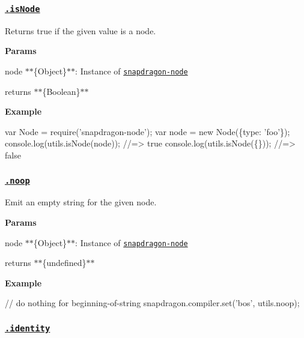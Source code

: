 \subsubsection*{\href{index.js#L21}{\tt .is\+Node}}

Returns true if the given value is a node.

{\bfseries Params}


\begin{DoxyItemize}
\item {\ttfamily node} $\ast$$\ast$\{Object\}$\ast$$\ast$\+: Instance of \href{https://github.com/jonschlinkert/snapdragon-node}{\tt snapdragon-\/node}
\item {\ttfamily returns} $\ast$$\ast$\{Boolean\}$\ast$$\ast$
\end{DoxyItemize}

{\bfseries Example}


\begin{DoxyCode}
var Node = require('snapdragon-node');
var node = new Node(\{type: 'foo'\});
console.log(utils.isNode(node)); //=> true
console.log(utils.isNode(\{\})); //=> false
\end{DoxyCode}


\subsubsection*{\href{index.js#L37}{\tt .noop}}

Emit an empty string for the given {\ttfamily node}.

{\bfseries Params}


\begin{DoxyItemize}
\item {\ttfamily node} $\ast$$\ast$\{Object\}$\ast$$\ast$\+: Instance of \href{https://github.com/jonschlinkert/snapdragon-node}{\tt snapdragon-\/node}
\item {\ttfamily returns} $\ast$$\ast$\{undefined\}$\ast$$\ast$
\end{DoxyItemize}

{\bfseries Example}


\begin{DoxyCode}
// do nothing for beginning-of-string
snapdragon.compiler.set('bos', utils.noop);
\end{DoxyCode}


\subsubsection*{\href{index.js#L53}{\tt .identity}}

